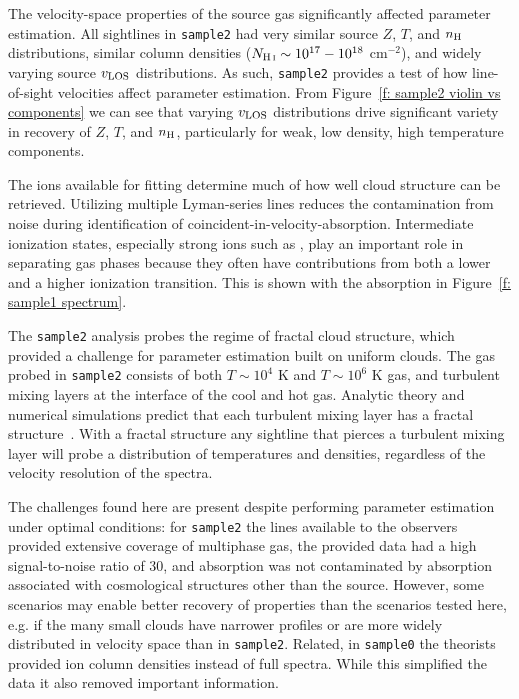 \documentclass[fleqn,usenatbib]{mnras}
\begin{document}
The velocity-space properties of the source gas significantly affected parameter estimation.
All sightlines in \texttt{sample2} had very similar source $Z$, $T$, and $n_{\rm H}$ distributions,
similar column densities ($N_{\ion{H}{I}} \sim 10^{17}-10^{18}$ cm$^{-2}$),
and widely varying source $v_{\rm LOS}$ distributions. 
As such, \texttt{sample2} provides a test of how line-of-sight velocities affect parameter estimation.
From Figure~\ref{f: sample2 violin vs components} we can see that varying $v_{\rm LOS}$ distributions drive significant variety in recovery of $Z$, $T$, and $n_{\rm H}$, particularly for weak, low density, high temperature components.

The ions available for fitting determine much of how well cloud structure can be retrieved.
Utilizing multiple Lyman-series lines reduces the contamination from noise during identification of coincident-in-velocity-absorption.
Intermediate ionization states, especially strong ions such as , play an important role in separating gas phases because they often have contributions from both a lower and a higher ionization transition.
This is shown with the  absorption in Figure~\ref{f: sample1 spectrum}.

The \texttt{sample2} analysis probes the regime of fractal cloud structure,
which provided a challenge for parameter estimation built on uniform clouds.
The gas probed in \texttt{sample2} consists of both $T \sim 10^4$ K and $T \sim 10^6$ K gas,
and turbulent mixing layers at the interface of the cool and hot gas.
Analytic theory and numerical simulations predict that each turbulent mixing layer has a fractal structure~\citep[e.g.][]{fielding2020Multiphase, Kanjilal.etal.2021, tan2021Model, Gronke.etal.2022}.
With a fractal structure any sightline that pierces a turbulent mixing layer will probe a distribution of temperatures and densities, regardless of the velocity resolution of the spectra.

The challenges found here are present despite performing parameter estimation under optimal conditions:
for \texttt{sample2} the lines available to the observers provided extensive coverage of multiphase gas, the provided data had a high signal-to-noise ratio of 30, and absorption was not contaminated by absorption associated with cosmological structures other than the source.
However, some scenarios may enable better recovery of properties than the scenarios tested here, e.g. if the many small clouds have narrower profiles or are more widely distributed in velocity space than in \texttt{sample2}.
Related, in \texttt{sample0} the theorists provided ion column densities instead of full spectra.
While this simplified the data it also removed important information.
\end{document}
